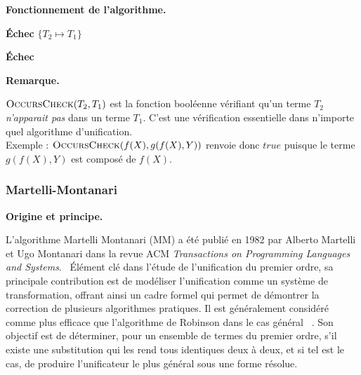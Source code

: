 \documentclass[11pt]{article}
\newenvironment{paraph}[1]{%
  \medskip
  \noindent\textbf{#1.}\quad

  \vspace{0.2cm}
}{%
  \medskip
}
\newenvironment{remarque}{%
    \begin{mdframed}[
        linecolor=sectioncolor!40,
        linewidth=0.8pt,
        backgroundcolor=sectioncolor!5,
        innerleftmargin=10pt,
        innerrightmargin=10pt,
        innertopmargin=6pt,
        innerbottommargin=6pt,
        skipabove=8pt,
        skipbelow=8pt
    ]
    \noindent\textbf{\small\color{sectioncolor}Remarque.}\enspace\small\itshape
}{%
    \end{mdframed}
}
\begin{document}
\begin{paraph}{Fonctionnement de l'algorithme}
\begin{algorithm}[H]
\begin{algorithmic}[1]
            \vspace{0.1cm}
            \State {}
                    \State\Return\textbf{Échec} 
                \EndIf
                \State\Return$\{T_2 \mapsto T_1\}$
            \EndIf
            
            \vspace{0.1cm}
            \State{}
            \State\Return\textbf{Échec} 
            
        \EndProcedure

    \end{algorithmic}
    \end{algorithm}
\end{paraph}

\begin{remarque}
    $\Call{OccursCheck}{T_2, T_1}$ est la fonction booléenne vérifiant
    qu'un terme $T_2$ \emph{n'apparait pas} dans un terme $T_1$.
    C'est une vérification essentielle dans n'importe quel algorithme
    d'unification.\\
    Exemple : $\Call{OccursCheck}{f(X), g(f(X), Y)}$ renvoie donc $true$ puisque le terme $g(f(X), Y)$ est composé de $f(X)$.
\end{remarque}
\newpage

\subsubsection{Martelli-Montanari}\label{sec:mm}

\begin{paraph}{Origine et principe}
    L’algorithme Martelli Montanari (MM) a été publié en 1982 par Alberto Martelli et Ugo
    Montanari dans la revue ACM \textit{Transactions on Programming Languages and Systems}.~\cite{martelli1982efficient}
    Élément clé dans l’étude de l’unification du premier ordre, sa principale contribution est
    de modéliser l'unification comme un système de transformation, offrant ainsi un cadre
    formel qui permet de démontrer la correction de plusieurs algorithmes pratiques. Il est généralement considéré comme plus efficace que l'algorithme 
    de Robinson dans le cas général ~\cite{martelli1982efficient}. Son objectif est de
    déterminer, pour un ensemble de termes du premier ordre, s'il existe une substitution
    qui les rend tous identiques deux à deux, et si tel est le cas, de produire l'unificateur le
    plus général sous une forme résolue.
\end{paraph}
\end{document}
